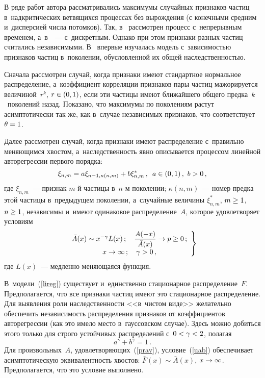 \begin{multicols}{2}
В ряде работ автора рассматривались максимумы
случайных признаков частиц в~надкритических ветвящихся процессах
без вырождения (с конечными средним и~дисперсией числа потомков).
Так, в~\cite{Leb5} рассмотрен процесс с~непрерывным временем, а~в~\cite{Leb60, Leb6}~---
с~дискретным. Однако
при этом признаки разных частиц считались независимыми. В~\cite{Leb7} впервые изучалась
модель с~зависимостью признаков частиц в~поколении, обусловленной их общей наследственностью.

Сначала рассмотрен случай, когда признаки имеют стандартное нормальное
распределение, а~коэффициент корреляции признаков пары частиц мажорируется величиной~$r^k$,
$r\hm\in (0,1)$, если эти частицы имеют ближайшего общего предка~$k$~поколений назад. Показано, что
максимумы по поколениям растут асимптотически так же, как в~случае независимых признаков,
что соответствует $\theta\hm=1$.

Далее рассмотрен случай, когда признаки имеют распределение с~правильно меняющимся
хвостом, а~наследственность явно описывается процессом линейной авторегрессии первого порядка:
\begin{equation}
\label{lireg}
\xi_{n,m}=a\xi_{n-1,\kappa(n,m)}+b\xi^*_{n,m}\,,\enskip a\in (0,1)\,,\ b>0\,,
\end{equation}
где $\xi_{n,m}$~--- признак $m$-й частицы в~$n$-м поколении;
$\kappa(n,m)$~--- номер предка этой частицы в~предыду\-щем поколении,
а~случайные величины $\xi^*_{n,m}$, $m\hm\ge 1$, $n\hm\ge 1$, независимы
и~имеют одинаковое распределение~$A$, которое удовлетворяет условиям
\begin{equation}
\left.
\begin{array}{c}
{\bar A}(x)\sim x^{-\gamma}L(x)\,;\quad \displaystyle\frac{\displaystyle A(-x)\mathstrut}{\displaystyle {\bar A}(x)\mathstrut}\to p\ge 0\,;
\\[6pt]
 x\to\infty\,;\quad \gamma>0\,,
 \end{array}
 \right\}
 \label{prav}
\end{equation}
где $L(x)$~--- медленно меняющаяся функция.

В~модели~(\ref{lireg}) существует и~единственно стационарное
распределение~$F$. Предполагается, что все признаки частиц имеют это
стационарное распределение.
Для выявления роли наследственности <<в~чис\-том виде>> желательно
обеспечить независимость распределения признаков от коэффициентов
авторегрессии (как это имело место в~гауссовском случае).
Здесь можно добиться этого только для строго устойчивых распределений
с~$0\hm<\gamma\hm<2$, полагая
\begin{equation}
\label{uab}
a^\gamma+b^\gamma=1\,.
\end{equation}
Для произвольных~$A$, удовлетворяющих~(\ref{prav}), условие~(\ref{uab})
обеспечивает асимптотическую эквивалентность хвостов:
${\bar F}(x)\sim {\bar A}(x)$, $x\hm\to\infty$.
Предполагается, что это условие выполнено.


\end{multicols}
